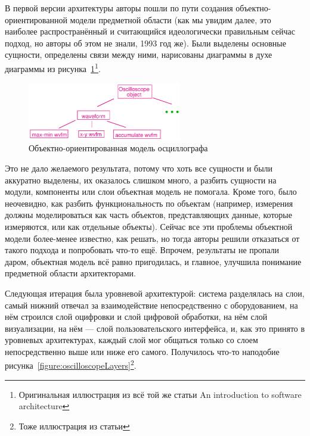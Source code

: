 \documentclass{../../text-style}
\begin{document}
В первой версии архитектуры авторы пошли по пути создания объектно-ориентированной модели предметной области (как мы увидим далее, это наиболее распространённый и считающийся идеологически правильным сейчас подход, но авторы об этом не знали, 1993 год же). Были выделены основные сущности, определены связи между ними, нарисованы диаграммы в духе диаграммы из рисунка~\ref{figure:oscilloscopeObjects}\footnote{Оригинальная иллюстрация из всё той же статьи An introduction to software architecture}.

\begin{figure}
    \begin{center}
        \includegraphics[width=0.6\textwidth]{oscilloscopeObjects.png}
    \end{center}
    \caption{Объектно-ориентированная модель осциллографа}
    \label{figure:oscilloscopeObjects}
\end{figure}

Это не дало желаемого результата, потому что хоть все сущности и были аккуратно выделены, их оказалось слишком много, а  разбить сущности на модули, компоненты или слои объектная модель не помогала. Кроме того, было неочевидно, как разбить функциональность по объектам (например, измерения должны моделироваться как часть объектов, представляющих данные, которые измеряются, или как отдельные объекты). Сейчас все эти проблемы объектной модели более-менее известно, как решать, но тогда авторы решили отказаться от такого подхода и попробовать что-то ещё. Впрочем, результаты не пропали даром, объектная модель всё равно пригодилась, и главное, улучшила понимание предметной области архитекторами.

Следующая итерация была уровневой архитектурой: система разделялась на слои, самый нижний отвечал за взаимодействие непосредственно с оборудованием, на нём строился слой оцифровки и слой цифровой обработки, на нём слой визуализации, на нём --- слой пользовательского интерфейса, и, как это принято в уровневых архитектурах, каждый слой мог общаться только со слоем непосредственно выше или ниже его самого. Получилось что-то наподобие рисунка~\ref{figure:oscilloscopeLayers}\footnote{Тоже иллюстрация из статьи}.
\end{document}
